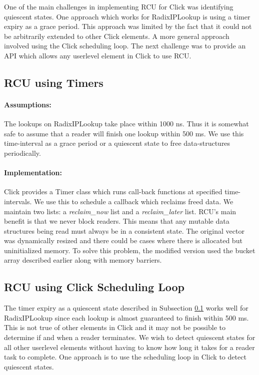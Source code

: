 \documentclass[a4paper,marginparwidth=50pt,marginparsep=10pt]{article}
\begin{document}
One of the main challenges in implementing RCU for Click was identifying quiescent states. One approach which works for RadixIPLookup  is using a timer expiry as a grace period. This approach was limited by the fact that it could not be arbitrarily extended to other Click elements. A more general approach involved using the Click scheduling loop. The next challenge was to provide an API which allows any userlevel element in Click to use RCU. 
\subsection{RCU using Timers}\label{sec:rcutimers}
\paragraph{Assumptions:}
The lookups on RadixIPLookup take place within 1000 ns. Thus it is somewhat safe to assume that a reader will finish one lookup within 500 ms.
We use this time-interval as a grace period or a quiescent state to free data-structures periodically.
\paragraph{Implementation:}
Click provides a Timer class which runs call-back functions at specified time-intervals. We use this to schedule a callback which reclaims freed data.
We maintain two lists: a \emph{reclaim\_now} list and a \emph{reclaim\_later} list.
RCU's main benefit is that we never block readers. This means that any mutable data structures being read must always be in a consistent state. The original vector was dynamically resized and there could be cases where there is allocated but uninitialized memory. To solve this problem, the modified version used the bucket array described earlier along with memory barriers. 
\subsection{RCU using Click Scheduling Loop}
\label{rcuschedloop}
The timer expiry as a quiescent state described in Subsection \ref{sec:rcutimers} works well for RadixIPLookup since each lookup is almost guaranteed to finish within 500 ms. This is not true of other elements in Click and it may not be possible to determine if and when a reader terminates. We wish to detect quiescent states for all other userlevel elements without having to know how long it takes for a reader task to complete. One approach is to use the scheduling loop in Click to detect quiescent states.
\end{document}
